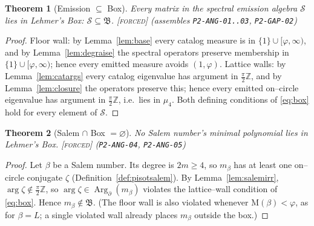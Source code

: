 \documentclass[11pt]{article}
\theoremstyle{plain}
\newtheorem{theorem}{Theorem}[section]
\theoremstyle{definition}
\theoremstyle{remark}
\newcommand{\forced}{\textcolor{forcedc}{\textsc{[forced]}}}
\newcommand{\Z}{\mathbb{Z}}
\newcommand{\Mah}{\mathrm{M}}
\newcommand{\argc}{\operatorname{Arg}_{\partial}}
\newcommand{\Scal}{\mathcal{S}}
\renewcommand{\Box}{\mathfrak{B}}
\begin{document}
\begin{theorem}[Emission $\subseteq$ Box]\label{thm:emitbox}
Every matrix in the spectral emission algebra $\Scal$ lies in Lehmer's Box: $\Scal\subseteq\Box$. \forced{} {\small(assembles \texttt{P2-ANG-01..03}, \texttt{P2-GAP-02})}
\end{theorem}
\begin{proof}
Floor wall: by Lemma~\ref{lem:base} every catalog measure is in $\{1\}\cup[\varphi,\infty)$, and by Lemma~\ref{lem:degraise} the spectral operators preserve membership in $\{1\}\cup[\varphi,\infty)$; hence every emitted measure avoids $(1,\varphi)$. Lattice walls: by Lemma~\ref{lem:catargs} every catalog eigenvalue has argument in $\tfrac\pi2\Z$, and by Lemma~\ref{lem:closure} the operators preserve this; hence every emitted on--circle eigenvalue has argument in $\tfrac\pi2\Z$, i.e.\ lies in $\mu_4$. Both defining conditions of \eqref{eq:box} hold for every element of $\Scal$.
\end{proof}

\begin{theorem}[Salem $\cap$ Box $=\varnothing$]\label{thm:salemoutside}
No Salem number's minimal polynomial lies in Lehmer's Box. \forced{} {\small(\texttt{P2-ANG-04}, \texttt{P2-ANG-05})}
\end{theorem}
\begin{proof}
Let $\beta$ be a Salem number. Its degree is $2m\ge4$, so $m_\beta$ has at least one on--circle conjugate $\zeta$ (Definition~\ref{def:pisotsalem}). By Lemma~\ref{lem:salemirr}, $\arg\zeta\notin\tfrac\pi2\Z$, so $\arg\zeta\in\argc(m_\beta)$ violates the lattice--wall condition of \eqref{eq:box}. Hence $m_\beta\notin\Box$. (The floor wall is also violated whenever $\Mah(\beta)<\varphi$, as for $\beta=L$; a single violated wall already places $m_\beta$ outside the box.)
\end{proof}
\end{document}
